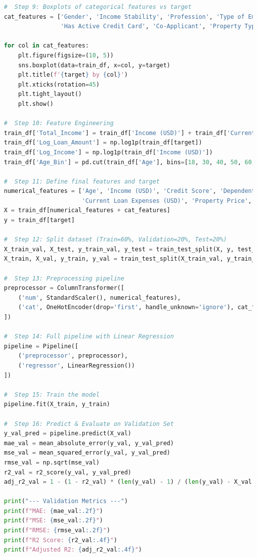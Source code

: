 \documentclass[12pt]{article}
\begin{document}
\begin{lstlisting}[language=Python]
#  Step 9: Boxplots of categorical features vs target
cat_features = ['Gender', 'Income Stability', 'Profession', 'Type of Employment',
                'Has Active Credit Card', 'Co-Applicant', 'Property Type']

for col in cat_features:
    plt.figure(figsize=(10, 5))
    sns.boxplot(data=train_df, x=col, y=target)
    plt.title(f'{target} by {col}')
    plt.xticks(rotation=45)
    plt.tight_layout()
    plt.show()

#  Step 10: Feature Engineering
train_df['Total_Income'] = train_df['Income (USD)'] + train_df['Current Loan Expenses (USD)']
train_df['Log_Loan_Amount'] = np.log1p(train_df[target])
train_df['Log_Income'] = np.log1p(train_df['Income (USD)'])
train_df['Age_Bin'] = pd.cut(train_df['Age'], bins=[18, 30, 40, 50, 60, 100], labels=False)

#  Step 11: Define final features and target
numerical_features = ['Age', 'Income (USD)', 'Credit Score', 'Dependents',
                      'Current Loan Expenses (USD)', 'Property Price', 'Property Age', 'Total_Income']
X = train_df[numerical_features + cat_features]
y = train_df[target]

#  Step 12: Split dataset (Train=60%, Validation=20%, Test=20%)
X_train_val, X_test, y_train_val, y_test = train_test_split(X, y, test_size=0.2, random_state=42)
X_train, X_val, y_train, y_val = train_test_split(X_train_val, y_train_val, test_size=0.25, random_state=42)

#  Step 13: Preprocessing pipeline
preprocessor = ColumnTransformer([
    ('num', StandardScaler(), numerical_features),
    ('cat', OneHotEncoder(drop='first', handle_unknown='ignore'), cat_features)
])

#  Step 14: Full pipeline with Linear Regression
pipeline = Pipeline([
    ('preprocessor', preprocessor),
    ('regressor', LinearRegression())
])

#  Step 15: Train the model
pipeline.fit(X_train, y_train)

#  Step 16: Predict & Evaluate on Validation Set
y_val_pred = pipeline.predict(X_val)
mae_val = mean_absolute_error(y_val, y_val_pred)
mse_val = mean_squared_error(y_val, y_val_pred)
rmse_val = np.sqrt(mse_val)
r2_val = r2_score(y_val, y_val_pred)
adj_r2_val = 1 - (1 - r2_val) * (len(y_val) - 1) / (len(y_val) - X_val.shape[1] - 1)

print("--- Validation Metrics ---")
print(f"MAE: {mae_val:.2f}")
print(f"MSE: {mse_val:.2f}")
print(f"RMSE: {rmse_val:.2f}")
print(f"R2 Score: {r2_val:.4f}")
print(f"Adjusted R2: {adj_r2_val:.4f}")


\end{lstlisting}
\end{document}
